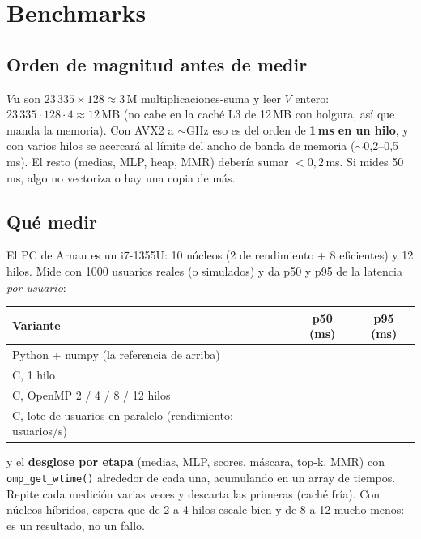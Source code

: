 \documentclass[a4paper,11pt]{article}
\newcommand{\cod}[1]{\texttt{#1}}
\begin{document}
\section{Benchmarks}

\subsection{Orden de magnitud antes de medir}
$V\mathbf{u}$ son $23\,335\times128 \approx 3$\,M multiplicaciones-suma y leer $V$ entero: $23\,335\cdot128\cdot4 \approx
12$\,MB (no cabe en la caché L3 de 12\,MB con holgura, así que manda la memoria). Con AVX2 a $\sim$GHz eso es del
orden de \textbf{1\,ms en un hilo}, y con varios hilos se acercará al límite del ancho de banda de memoria
($\sim$0,2--0,5\,ms). El resto (medias, MLP, heap, MMR) debería sumar $< 0{,}2$\,ms. Si mides 50\,ms, algo no vectoriza
o hay una copia de más.

\subsection{Qué medir}
El PC de Arnau es un i7-1355U: 10 núcleos (2 de rendimiento + 8 eficientes) y 12 hilos. Mide con 1000 usuarios
reales (o simulados) y da p50 y p95 de la latencia \emph{por usuario}:
\begin{center}
\begin{tabular}{lcc}
\toprule
Variante & p50 (ms) & p95 (ms) \\
\midrule
Python + numpy (la referencia de arriba) & & \\
C, 1 hilo & & \\
C, OpenMP 2 / 4 / 8 / 12 hilos & & \\
C, lote de usuarios en paralelo (rendimiento: usuarios/s) & & \\
\bottomrule
\end{tabular}
\end{center}
y el \textbf{desglose por etapa} (medias, MLP, scores, máscara, top-k, MMR) con \cod{omp\_get\_wtime()} alrededor de
cada una, acumulando en un array de tiempos. Repite cada medición varias veces y descarta las primeras (caché fría).
Con núcleos híbridos, espera que de 2 a 4 hilos escale bien y de 8 a 12 mucho menos: es un resultado, no un fallo.
\end{document}
